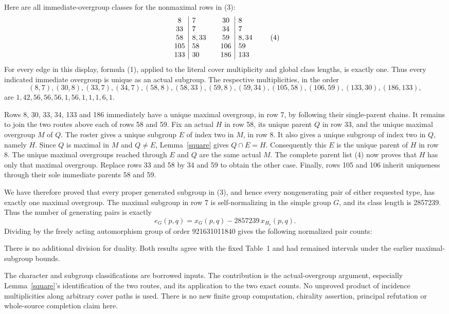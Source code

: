 \documentclass[11pt,a4paper]{article}
\begin{document}
Here are all immediate-overgroup classes for the nonmaximal rows
in (3):
\[
\begin{array}{c|l@{\qquad}c|l}
8&7&30&8\\
33&7&34&7\\
58&8,33&59&8,34\\
105&58&106&59\\
133&30&186&133
\end{array}                                                   \tag{4}
\]
For every edge in this display, formula (1), applied to the literal
cover multiplicity and global class lengths, is exactly one. Thus
every indicated immediate overgroup is unique as an actual subgroup.
The respective multiplicities, in the order
\[
(8,7),(30,8),(33,7),(34,7),(58,8),(58,33),
(59,8),(59,34),(105,58),(106,59),(133,30),(186,133),
\]
are $1,42,56,56,56,1,56,1,1,1,6,1$.

Rows 8, 30, 33, 34, 133 and 186 immediately have a unique maximal
overgroup, in row 7, by following their single-parent chains.
It remains to join the two routes above each of rows 58 and 59.
Fix an actual $H$ in row 58, its unique parent $Q$ in row 33,
and the unique maximal overgroup $M$ of $Q$. The roster gives a
unique subgroup $E$ of index two in $M$, in row 8. It also gives
a unique subgroup of index two in $Q$, namely $H$. Since $Q$ is
maximal in $M$ and $Q\neq E$, Lemma~\ref{square} gives $Q\cap E=H$.
Consequently this $E$ is the unique parent of $H$ in row 8. The
unique maximal overgroups reached through $E$ and $Q$ are the same
actual $M$. The complete parent list (4) now proves that $H$ has
only that maximal overgroup. Replace rows 33 and 58 by 34 and 59
to obtain the other case. Finally, rows 105 and 106 inherit
uniqueness through their sole immediate parents 58 and 59.

We have therefore proved that every proper generated subgroup in
(3), and hence every nongenerating pair of either requested type,
has exactly one maximal overgroup. The maximal subgroup in row 7
is self-normalizing in the simple group $G$, and its class length
is 2857239. Thus the number of generating pairs is exactly
\[
 e_G(p,q)=x_G(p,q)-2857239\,x_{H_7}(p,q).                      \tag{5}
\]
Dividing by the freely acting automorphism group of order
921631011840 gives the following normalized pair counts:

There is no additional division for duality. Both results agree
with the fixed Table~1 and had remained intervals under the earlier
maximal-subgroup bounds.

The character and subgroup classifications are borrowed inputs.
The contribution is the actual-overgroup argument, especially
Lemma~\ref{square}'s identification of the two routes, and its
application to the two exact counts. No unproved product of
incidence multiplicities along arbitrary cover paths is used.
There is no new finite group computation, chirality assertion,
principal refutation or whole-source completion claim here.
\end{document}
